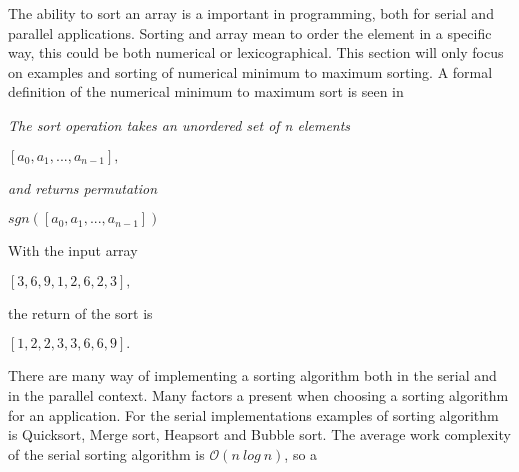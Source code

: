 The ability to sort an array is a important in programming, both for serial and parallel applications. Sorting and array mean to order the element in a specific way, this could be both numerical or lexicographical. This section will only focus on examples and sorting of numerical minimum to maximum sorting. A formal definition of the numerical minimum to maximum sort is seen in   

\begin{definition}
	\label{def:al_sort}
	\textit{The sort operation takes an unordered set of n elements}
	\begin{center}
		$[a_0,a_1,...,a_{n-1}],$
	\end{center}
	\textit{and returns permutation}
	\begin{center}
		$sgn([a_0,a_1,...,a_{n-1}])$
	\end{center}
\end{definition}
\begin{example}
	With the input array
	\begin{center}
		$[3,6,9,1,2,6,2,3],$
	\end{center}
	the return of the sort is
	\begin{center}
		$[1,2,2,3,3,6,6,9].$
	\end{center}
\end{example}

There are many way of implementing a sorting algorithm both in the serial and in the parallel context. Many factors a present when choosing a sorting algorithm for an application. For the serial implementations examples of sorting algorithm is Quicksort, Merge sort, Heapsort and Bubble sort. The average work complexity of the serial sorting algorithm is $\mathcal{O}(n~log~n)$, so a  